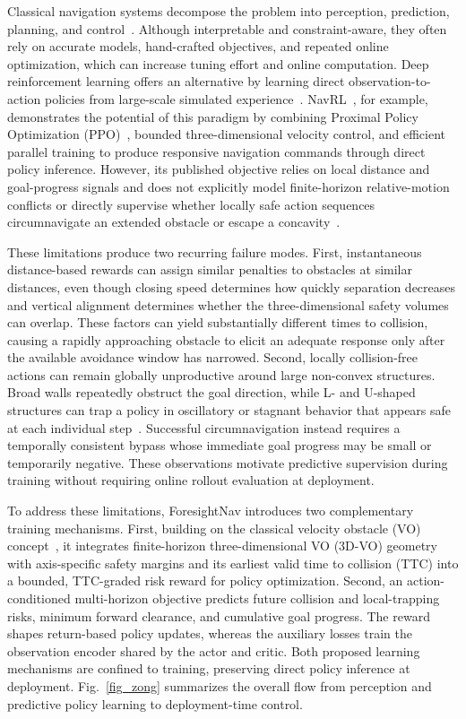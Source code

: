 \documentclass[letterpaper, 10 pt, conference]{ieeeconf}
\begin{document}
Classical navigation systems decompose the problem into perception, prediction, planning, and control~\cite{pe_planner,faster,vigo}. Although interpretable and constraint-aware, they often rely on accurate models, hand-crafted objectives, and repeated online optimization, which can increase tuning effort and online computation. Deep reinforcement learning offers an alternative by learning direct observation-to-action policies from large-scale simulated experience~\cite{cadrl,long2018,navrl}. NavRL~\cite{navrl}, for example, demonstrates the potential of this paradigm by combining Proximal Policy Optimization (PPO)~\cite{ppo}, bounded three-dimensional velocity control, and efficient parallel training to produce responsive navigation commands through direct policy inference. However, its published objective relies on local distance and goal-progress signals and does not explicitly model finite-horizon relative-motion conflicts or directly supervise whether locally safe action sequences circumnavigate an extended obstacle or escape a concavity~\cite{navrl}.

These limitations produce two recurring failure modes. First, instantaneous distance-based rewards can assign similar penalties to obstacles at similar distances, even though closing speed determines how quickly separation decreases and vertical alignment determines whether the three-dimensional safety volumes can overlap. These factors can yield substantially different times to collision, causing a rapidly approaching obstacle to elicit an adequate response only after the available avoidance window has narrowed. Second, locally collision-free actions can remain globally unproductive around large non-convex structures. Broad walls repeatedly obstruct the goal direction, while L- and U-shaped structures can trap a policy in oscillatory or stagnant behavior that appears safe at each individual step~\cite{lee2026privileged}. Successful circumnavigation instead requires a temporally consistent bypass whose immediate goal progress may be small or temporarily negative. These observations motivate predictive supervision during training without requiring online rollout evaluation at deployment.

To address these limitations, ForesightNav introduces two complementary training mechanisms. First, building on the classical velocity obstacle (VO) concept~\cite{fiorini1998vo}, it integrates finite-horizon three-dimensional VO (3D-VO) geometry with axis-specific safety margins and its earliest valid time to collision (TTC) into a bounded, TTC-graded risk reward for policy optimization. Second, an action-conditioned multi-horizon objective predicts future collision and local-trapping risks, minimum forward clearance, and cumulative goal progress. The reward shapes return-based policy updates, whereas the auxiliary losses train the observation encoder shared by the actor and critic. Both proposed learning mechanisms are confined to training, preserving direct policy inference at deployment. Fig.~\ref{fig_zong} summarizes the overall flow from perception and predictive policy learning to deployment-time control.
\end{document}
